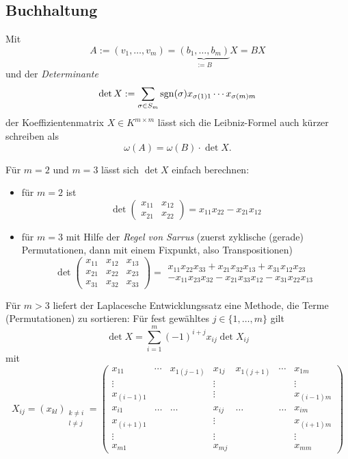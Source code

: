 \subsection{Buchhaltung}
	\begin{Definition}[Determinante]
		Mit 
		\[ A:= (v_1,\dots,v_m)=\underbrace{(b_1,\dots,b_m)}_{:=B}X = BX \]
	und der \emph{Determinante}
		\[ \det X := \sum_{\sigma\in S_m}\operatorname{sgn}(\sigma)x_{\sigma(1)1}\cdots x_{\sigma(m)m} \]
	der Koeffizientenmatrix $ X\in K^{m\times m} $ lässt sich die Leibniz-Formel auch kürzer schreiben als
		\[ \omega(A) = \omega(B)\cdot\det X. \]
	\end{Definition}
	Für $ m=2 $ und $ m=3 $ lässt sich $ \det X $ einfach berechnen:
		\begin{itemize}
			\item für $ m=2 $ ist
				\[ \det \begin{pmatrix}
						x_{11}& x_{12}\\ x_{21} & x_{22}
					\end{pmatrix}
					= x_{11}x_{22}-x_{21}x_{12}
				\]
			\item für $ m=3 $ mit Hilfe der \emph{Regel von Sarrus} (zuerst zyklische (gerade) Permutationen, dann mit einem Fixpunkt, also Transpositionen)
				\[ \det \begin{pmatrix}
					x_{11} & x_{12} & x_{13}\\
					x_{21} & x_{22} & x_{23}\\
					x_{31} & x_{32} & x_{33}
				\end{pmatrix}
				 = 	 \begin{matrix}
				 x_{11}x_{22}x_{33}
				 +x_{21}x_{32}x_{13}
				 +x_{31}x_{12}x_{23}\\
				 -x_{11}x_{23}x_{32}
				 -x_{21}x_{33}x_{12}
				 -x_{31}x_{22}x_{13}
				 \end{matrix} \]
			\end{itemize}
	Für $ m>3 $ liefert der Laplacesche Entwicklungssatz eine Methode, die Terme (Permutationen) zu sortieren: Für fest gewähltes $ j\in \{1,\dots, m \} $ gilt
		\[ \det X = \sum_{i=1}^{m}(-1)^{i+j}x_{ij}\det X_{ij} \]
	mit
		\[ X_{ij} = (x_{kl})_{\substack{k\neq i\\ l\neq j}} = 
		\begin{pmatrix}
			x_{11} & \cdots & x_{1(j-1)} & x_{1j} & x_{1(j+1)} & \cdots & x_{1m} \\ 
			\vdots &        &  	&  \vdots	&  	&  	& \vdots \\ 
			x_{(i-1)1} 	&  	&  	& \vdots 	&  	&  	& x_{(i-1)m} \\ 
			x_{i1} 	& \dots	& \dots & x_{ij} & \dots & \dots 	& x_{im} \\ 
			x_{(i+1)1} &  &  & \vdots  &  &  & x_{(i+1)m} \\ 
			\vdots &  &  & \vdots &  &  &\vdots  \\ 
			x_{m1} &  &  & x_{mj} &  &  & x_{mm}
			\end{pmatrix}  \]
